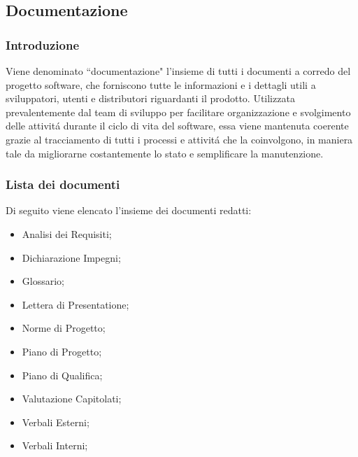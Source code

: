 \subsection{Documentazione}
\subsubsection{Introduzione}
Viene denominato ``documentazione" l'insieme di tutti i documenti a corredo del progetto software, che forniscono tutte le informazioni e i dettagli utili a sviluppatori, utenti e distributori riguardanti il prodotto. Utilizzata prevalentemente dal team di sviluppo per facilitare organizzazione e svolgimento delle attivitá durante il ciclo di vita del software, essa viene mantenuta coerente grazie al tracciamento di tutti i processi e attivitá che la coinvolgono, in maniera tale da migliorarne costantemente lo stato e semplificare la manutenzione.
\subsubsection{Lista dei documenti}
Di seguito viene elencato l'insieme dei documenti redatti:
\begin{itemize}
    \item Analisi dei Requisiti;
    \item Dichiarazione Impegni;
    \item Glossario;
    \item Lettera di Presentatione;
    \item Norme di Progetto;
    \item Piano di Progetto;
    \item Piano di Qualifica;
    \item Valutazione Capitolati;
    \item Verbali Esterni;
    \item Verbali Interni;
\end{itemize}

